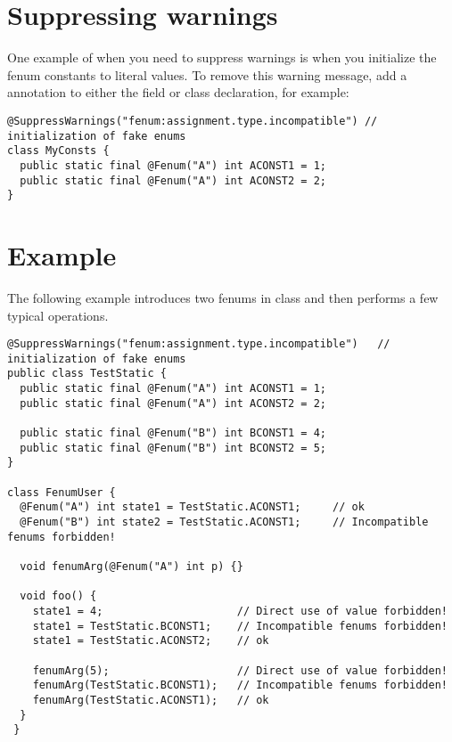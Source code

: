\section{Suppressing warnings\label{fenum-suppressing}}

One example of when you need to suppress warnings is when you initialize the
fenum constants to literal values.
To remove this warning message, add a  annotation to either
the field or class declaration, for example:

\begin{Verbatim}
@SuppressWarnings("fenum:assignment.type.incompatible") // initialization of fake enums
class MyConsts {
  public static final @Fenum("A") int ACONST1 = 1;
  public static final @Fenum("A") int ACONST2 = 2;
}
\end{Verbatim}



\section{Example\label{fenum-example}}

The following example introduces two fenums in class 
and then performs a few typical operations.

\begin{Verbatim}
@SuppressWarnings("fenum:assignment.type.incompatible")   // initialization of fake enums
public class TestStatic {
  public static final @Fenum("A") int ACONST1 = 1;
  public static final @Fenum("A") int ACONST2 = 2;

  public static final @Fenum("B") int BCONST1 = 4;
  public static final @Fenum("B") int BCONST2 = 5;
}

class FenumUser {
  @Fenum("A") int state1 = TestStatic.ACONST1;     // ok
  @Fenum("B") int state2 = TestStatic.ACONST1;     // Incompatible fenums forbidden!

  void fenumArg(@Fenum("A") int p) {}

  void foo() {
    state1 = 4;                     // Direct use of value forbidden!
    state1 = TestStatic.BCONST1;    // Incompatible fenums forbidden!
    state1 = TestStatic.ACONST2;    // ok

    fenumArg(5);                    // Direct use of value forbidden!
    fenumArg(TestStatic.BCONST1);   // Incompatible fenums forbidden!
    fenumArg(TestStatic.ACONST1);   // ok
  }
 }
\end{Verbatim}


